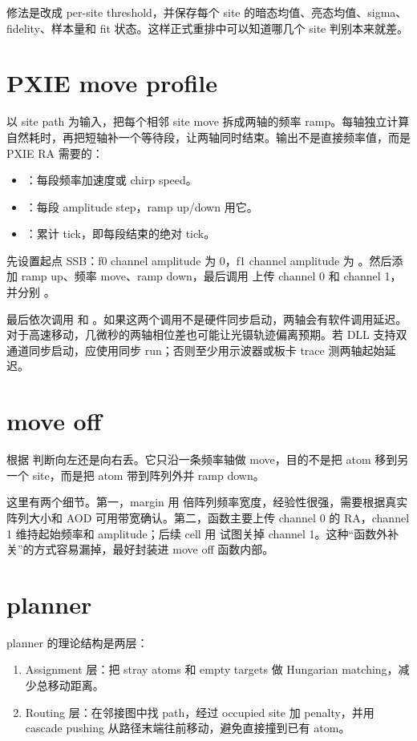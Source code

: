 \documentclass[11pt,oneside,openany]{book}
\begin{document}
修法是改成 per-site threshold，并保存每个 site 的暗态均值、亮态均值、sigma、fidelity、样本量和 fit 状态。这样正式重排中可以知道哪几个 site 判别本来就差。

\section{PXIE move profile}
 以 site path 为输入，把每个相邻 site move 拆成两轴的频率 ramp。每轴独立计算自然耗时，再把短轴补一个等待段，让两轴同时结束。输出不是直接频率值，而是 PXIE RA 需要的：
\begin{itemize}
  \item {}：每段频率加速度或 chirp speed。
  \item {}：每段 amplitude step，ramp up/down 用它。
  \item {}：累计 tick，即每段结束的绝对 tick。
\end{itemize}

 先设置起点 SSB：f0 channel amplitude 为 0，f1 channel amplitude 为 。然后添加 ramp up、频率 move、ramp down，最后调用  上传 channel 0 和 channel 1，并分别 。

\begin{notebox}[两轴同步风险]
 最后依次调用  和 。如果这两个调用不是硬件同步启动，两轴会有软件调用延迟。对于高速移动，几微秒的两轴相位差也可能让光镊轨迹偏离预期。若 DLL 支持双通道同步启动，应使用同步 run；否则至少用示波器或板卡 trace 测两轴起始延迟。
\end{notebox}

\section{move off}
 根据  判断向左还是向右丢。它只沿一条频率轴做 move，目的不是把 atom 移到另一个 site，而是把 atom 带到阵列外并 ramp down。

这里有两个细节。第一，margin 用  倍阵列频率宽度，经验性很强，需要根据真实阵列大小和 AOD 可用带宽确认。第二，函数主要上传 channel 0 的 RA，channel 1 维持起始频率和 amplitude；后续 cell 用  试图关掉 channel 1。这种“函数外补关”的方式容易漏掉，最好封装进 move off 函数内部。

\section{planner}
planner 的理论结构是两层：
\begin{enumerate}
  \item Assignment 层：把 stray atoms 和 empty targets 做 Hungarian matching，减少总移动距离。
  \item Routing 层：在邻接图中找 path，经过 occupied site 加 penalty，并用 cascade pushing 从路径末端往前移动，避免直接撞到已有 atom。
\end{enumerate}
\end{document}
